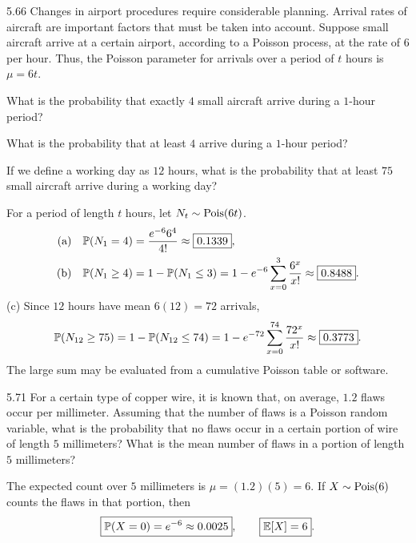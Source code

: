 \documentclass[11pt,oneside]{article}
\begin{document}
\begin{exercise}{5.66}
Changes in airport procedures require considerable planning. Arrival rates of aircraft are important factors that must be taken into account. Suppose small aircraft arrive at a certain airport, according to a Poisson process, at the rate of $6$ per hour. Thus, the Poisson parameter for arrivals over a period of $t$ hours is $\mu=6t$.
\begin{exercisesubparts}
\item What is the probability that exactly $4$ small aircraft arrive during a $1$-hour period?
\item What is the probability that at least $4$ arrive during a $1$-hour period?
\item If we define a working day as $12$ hours, what is the probability that at least $75$ small aircraft arrive during a working day?
\end{exercisesubparts}
\end{exercise}
\begin{solution}
For a period of length $t$ hours, let $N_t\sim\operatorname{Pois}(6t)$.
\begin{align*}
\textup{(a)}\quad\mathbb{P}(N_1=4)&=\frac{e^{-6}6^4}{4!}\approx\boxed{0.1339},\\
\textup{(b)}\quad\mathbb{P}(N_1\ge4)&=1-\mathbb{P}(N_1\le3)
=1-e^{-6}\sum_{x=0}^{3}\frac{6^x}{x!}
\approx\boxed{0.8488}.
\end{align*}
\noindent\textup{(c)} Since $12$ hours have mean $6(12)=72$ arrivals,
\[
\mathbb{P}(N_{12}\ge75)=1-\mathbb{P}(N_{12}\le74)
=1-e^{-72}\sum_{x=0}^{74}\frac{72^x}{x!}
\approx\boxed{0.3773}.
\]
The large sum may be evaluated from a cumulative Poisson table or software.
\end{solution}

\begin{exercise}{5.71}
For a certain type of copper wire, it is known that, on average, $1.2$ flaws occur per millimeter. Assuming that the number of flaws is a Poisson random variable, what is the probability that no flaws occur in a certain portion of wire of length $5$ millimeters? What is the mean number of flaws in a portion of length $5$ millimeters?
\end{exercise}
\begin{solution}
The expected count over $5$ millimeters is $\mu=(1.2)(5)=6$. If $X\sim\operatorname{Pois}(6)$ counts the flaws in that portion, then
\[
\boxed{\mathbb{P}(X=0)=e^{-6}\approx0.0025},
\qquad\boxed{\mathbb{E}[X]=6}.
\]
\end{solution}
\end{document}
